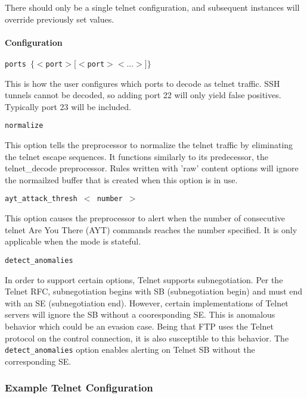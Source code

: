 \documentclass[english]{report}
\newcounter{slistnum}
\newenvironment{slist}
{ \begin{list}{ {\bf \arabic{slistnum}.} }{\usecounter{slistnum} } }
{ \end{list} }
\begin{document}
There should  only be a single telnet configuration, and subsequent instances
will override previously set values.

\paragraph{Configuration}
\begin{slist}
\item \texttt{ports $\{ <$port$> [<$port$> <...>] \}$}

This is how the user configures which ports to decode as telnet traffic.  SSH
tunnels cannot be decoded, so adding port 22 will only yield false positives.
Typically port 23 will be included.

\item \texttt{normalize}

This option tells the preprocessor to normalize the telnet traffic by
eliminating the telnet escape sequences.  It functions similarly to its
predecessor, the telnet\_decode preprocessor.  Rules written with 'raw' content
options will ignore the normailzed buffer that is created when this option is
in use.

\item \texttt{ayt\_attack\_thresh $<$ number $>$}

This option causes the preprocessor to alert when the number of consecutive
telnet Are You There (AYT) commands reaches the number specified.  It is only
applicable when the mode is stateful.

\item \texttt{detect\_anomalies}

In order to support certain options, Telnet supports subnegotiation. Per the
Telnet RFC, subnegotiation begins with SB (subnegotiation begin) and must end
with an SE (subnegotiation end). However, certain implementations of Telnet
servers will ignore the SB without a cooresponding SE. This is anomalous
behavior which could be an evasion case. Being that FTP uses the Telnet
protocol on the control connection, it is also susceptible to this behavior.
The \texttt{detect\_anomalies} option enables alerting on Telnet SB without the
corresponding SE.

\end{slist}

\subsubsection{Example Telnet Configuration}
\end{document}
